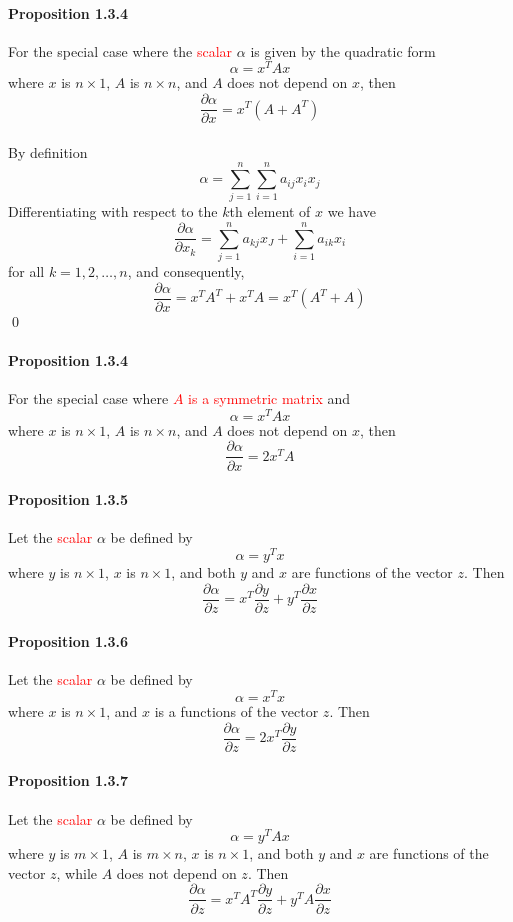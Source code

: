 \documentclass[11pt]{article}
\begin{document}
\paragraph{Proposition 1.3.4}
For the special case where the \textcolor{red}{scalar} $\alpha$ is given by the quadratic form
$$\alpha = x^TAx$$
where $x$ is $n \times 1$, $A$ is $n \times n$, and $A$ does not depend on $x$, then
$$\frac{\partial \alpha}{\partial x} = x^T (A + A^T)$$
 \\
By definition
$$\alpha = \sum_{j=1}^n \sum_{i=1}^n a_{ij}x_ix_j$$
Differentiating with respect to the $k$th element of $x$ we have
$$\frac{\partial \alpha}{\partial x_k} = \sum_{j=1}^n a_{kj}x_J + \sum_{i=1}^n a_{ik}x_i$$
for all $k = 1,2, \hdots, n$, and consequently,
$$\frac{\partial \alpha}{\partial x} = x^TA^T + x^TA = x^T(A^T + A)$$ \qed

\paragraph{Proposition 1.3.4}
For the special case where \textcolor{red}{$A$ is a symmetric matrix} and
$$\alpha = x^TAx$$
where $x$ is $n \times 1$, $A$ is $n \times n$, and $A$ does not depend on $x$, then
$$\frac{\partial \alpha}{\partial x} = 2x^TA$$

\paragraph{Proposition 1.3.5}
Let the \textcolor{red}{scalar} $\alpha$ be defined by
$$\alpha = y^Tx$$
where $y$ is $n \times 1$, $x$ is $n \times 1$, and both $y$ and $x$ are functions of the vector $z$. Then
$$\frac{\partial \alpha}{\partial z} = x^T \frac{\partial y}{\partial z} + y^T \frac{\partial x}{\partial z}$$

\paragraph{Proposition 1.3.6}
Let the \textcolor{red}{scalar} $\alpha$ be defined by
$$\alpha = x^Tx$$
where $x$ is $n \times 1$, and $x$ is a functions of the vector $z$. Then
$$\frac{\partial \alpha}{\partial z} = 2x^T \frac{\partial y}{\partial z}$$

\paragraph{Proposition 1.3.7}
Let the \textcolor{red}{scalar} $\alpha$ be defined by
$$\alpha = y^TAx$$
where $y$ is $m \times 1$, $A$ is $m \times n$, $x$ is $n \times 1$, and both $y$ and $x$ are functions of the vector $z$, while $A$ does not depend on $z$. Then
$$\frac{\partial \alpha}{\partial z} = x^T A^T\frac{\partial y}{\partial z} + y^T A\frac{\partial x}{\partial z}$$
\end{document}
